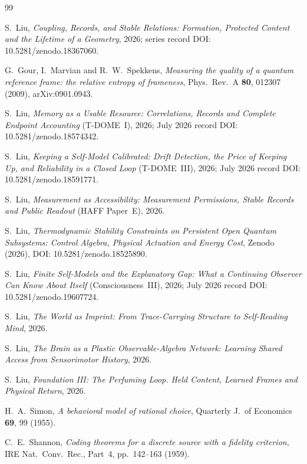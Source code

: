 \documentclass[12pt]{article}
\theoremstyle{definition}
\begin{document}
\begin{thebibliography}{99}

S.~Liu, \emph{Coupling, Records, and Stable Relations: Formation, Protected Content and the Lifetime of a Geometry}, 2026; series record DOI: 10.5281/zenodo.18367060.

G.~Gour, I.~Marvian and R.~W.~Spekkens,
\emph{Measuring the quality of a quantum reference frame: the relative entropy
of frameness}, Phys.\ Rev.\ A \textbf{80}, 012307 (2009), arXiv:0901.0943.

S.~Liu, \emph{Memory as a Usable Resource: Correlations, Records and Complete Endpoint Accounting} (T-DOME~I), 2026; July 2026 record DOI: 10.5281/zenodo.18574342.

S.~Liu, \emph{Keeping a Self-Model Calibrated: Drift Detection, the Price of Keeping Up, and Reliability in a Closed Loop} (T-DOME~III), 2026; July 2026 record DOI: 10.5281/zenodo.18591771.

S.~Liu, \emph{Measurement as Accessibility: Measurement Permissions, Stable Records and Public Readout} (HAFF Paper~E), 2026.

S.~Liu, \emph{Thermodynamic Stability Constraints on Persistent Open Quantum Subsystems: Control Algebra, Physical Actuation and Energy Cost}, Zenodo (2026), DOI: 10.5281/zenodo.18525890.

S.~Liu, \emph{Finite Self-Models and the Explanatory Gap: What a Continuing Observer Can Know About Itself} (Consciousness~III), 2026; July 2026 record DOI: 10.5281/zenodo.19607724.

S.~Liu, \emph{The World as Imprint: From Trace-Carrying Structure to Self-Reading Mind}, 2026.

S.~Liu, \emph{The Brain as a Plastic Observable-Algebra Network: Learning Shared Access from Sensorimotor History}, 2026.

S.~Liu, \emph{Foundation III: The Perfuming Loop. Held Content, Learned Frames and Physical Return}, 2026.

H.~A.~Simon,
\emph{A behavioral model of rational choice},
Quarterly J.\ of Economics \textbf{69}, 99 (1955).

C.~E.~Shannon,
\emph{Coding theorems for a discrete source with a fidelity criterion},
IRE Nat.\ Conv.\ Rec., Part~4, pp.~142--163 (1959).


\end{thebibliography}
\end{document}

